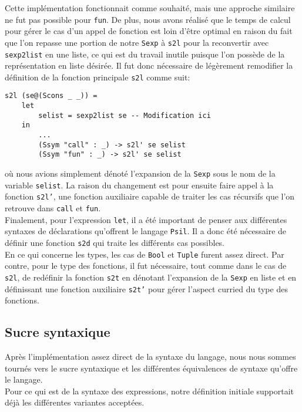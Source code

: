 \documentclass[10pt, titlepage]{article}
\begin{document}
Cette implémentation fonctionnait comme souhaité, mais une approche similaire
ne fut pas possible pour \texttt{fun}. De plus, nous avons réalisé que le temps
de calcul pour gérer le cas d'un appel de fonction est loin d'être optimal en
raison du fait que l'on repasse une portion de notre \texttt{Sexp} à
\texttt{s2l} pour la reconvertir avec \texttt{sexp2list} en une liste, ce qui
est du travail inutile puisque l'on possède de la représentation en liste
désirée. Il fut donc nécessaire de légèrement remodifier la définition de la
fonction principale \texttt{s2l} comme suit:
\begin{lstlisting}
s2l (se@(Scons _ _)) =
    let
        selist = sexp2list se -- Modification ici
    in
        ...
        (Ssym "call" : _) -> s2l' se selist
        (Ssym "fun" : _) -> s2l' se selist
\end{lstlisting}
où nous avions simplement dénoté l'expansion de la \texttt{Sexp} sous le nom de
la variable \texttt{selist}. La raison du changement est pour ensuite faire
appel à la fonction \texttt{s2l'}, une fonction auxiliaire capable de traiter
les cas récursifs que l'on retrouve dans \texttt{call} et \texttt{fun}. \\
Finalement, pour l'expression \texttt{let}, il a été important de penser aux
différentes syntaxes de déclarations qu'offrent le langage \texttt{Psil}. Il a
donc été nécessaire de définir une fonction \texttt{s2d} qui traite les
différents cas possibles. \\

En ce qui concerne les types, les cas de \texttt{Bool} et \texttt{Tuple} furent
assez direct. Par contre, pour le type des fonctions, il fut nécessaire, tout
comme dans le cas de \texttt{s2l}, de redéfinir la fonction \texttt{s2t} en
dénotant l'expansion de la \texttt{Sexp} en liste et en définissant une
fonction auxiliaire \texttt{s2t'} pour gérer l'aspect curried du type des
fonctions.

\subsection{Sucre syntaxique}

Après l'implémentation assez direct de la syntaxe du langage, nous nous sommes
tournés vers le sucre syntaxique et les différentes équivalences de syntaxe
qu'offre le langage. \\

Pour ce qui est de la syntaxe des expressions, notre définition initiale
supportait déjà les différentes variantes acceptées. \\
\end{document}
